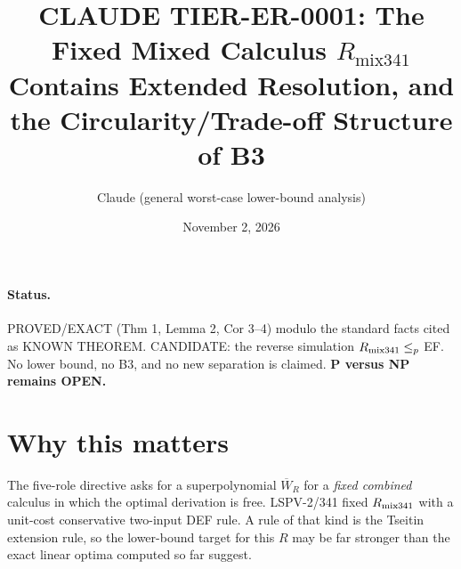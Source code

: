 \documentclass[11pt]{article}
\title{CLAUDE TIER-ER-0001: The Fixed Mixed Calculus $R_{\mathrm{mix341}}$ Contains Extended Resolution, and the Circularity/Trade-off Structure of B3}
\author{Claude (general worst-case lower-bound analysis)}
\date{November 2, 2026}
\begin{document}
\maketitle
\paragraph{Status.} PROVED/EXACT (Thm 1, Lemma 2, Cor 3--4) modulo the standard facts cited as KNOWN THEOREM. CANDIDATE: the reverse simulation $R_{\rm mix341}\le_p$ EF. No lower bound, no B3, and no new separation is claimed. \textbf{P versus NP remains OPEN.}

\section{Why this matters}
The five-role directive asks for a superpolynomial $\overline W_R$ for a \emph{fixed combined} calculus in which the optimal derivation is free. LSPV-2/341 fixed $R_{\rm mix341}$ with a unit-cost conservative two-input DEF rule. A rule of that kind is the Tseitin extension rule, so the lower-bound target for this $R$ may be far stronger than the exact linear optima computed so far suggest.
\end{document}
